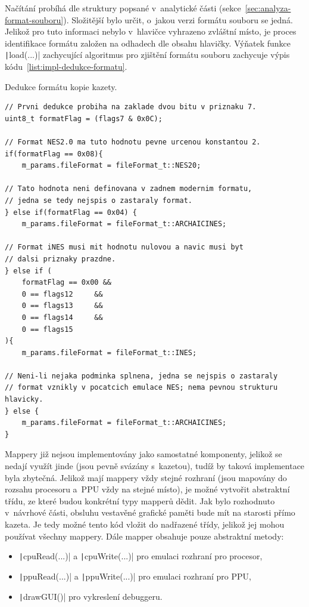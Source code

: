 Načítání probíhá dle struktury popsané v~analytické části (sekce~\ref{sec:analyza-format-souboru}). Složitější bylo určit, o~jakou verzi formátu souboru se jedná. Jelikož pro tuto informaci nebylo v~hlavičce vyhrazeno zvláštní místo, je proces identifikace formátu založen na odhadech dle obsahu hlavičky. Výňatek funkce \texttt|load(...)| zachycující algoritmus pro zjištění formátu souboru zachycuje výpis kódu~\ref{list:impl-dedukce-formatu}.

\begin{listing}
	\caption{Dedukce formátu kopie kazety.}
	\label{list:impl-dedukce-formatu}
	\begin{verbatim}
// Prvni dedukce probiha na zaklade dvou bitu v priznaku 7.
uint8_t formatFlag = (flags7 & 0x0C);

// Format NES2.0 ma tuto hodnotu pevne urcenou konstantou 2.
if(formatFlag == 0x08){
	m_params.fileFormat = fileFormat_t::NES20;
	
// Tato hodnota neni definovana v zadnem modernim formatu,
// jedna se tedy nejspis o zastaraly format.
} else if(formatFlag == 0x04) {
	m_params.fileFormat = fileFormat_t::ARCHAICINES;
	
// Format iNES musi mit hodnotu nulovou a navic musi byt
// dalsi priznaky prazdne.
} else if (
	formatFlag == 0x00 &&
	0 == flags12     &&
	0 == flags13     &&
	0 == flags14     &&
	0 == flags15
){
	m_params.fileFormat = fileFormat_t::INES;
	
// Neni-li nejaka podminka splnena, jedna se nejspis o zastaraly
// format vznikly v pocatcich emulace NES; nema pevnou strukturu hlavicky.
} else {
	m_params.fileFormat = fileFormat_t::ARCHAICINES;
}	
	\end{verbatim}
\end{listing}

Mappery již nejsou implementovány jako samostatné komponenty, jelikož se nedají využít jinde (jsou pevně svázány s~kazetou), tudíž by taková implementace byla zbytečná. Jelikož mají mappery vždy stejné rozhraní (jsou mapovány do rozsahu procesoru a~PPU vždy na stejné místo), je možné vytvořit abstraktní třídu, ze které budou konkrétní typy mapperů dědit. Jak bylo rozhodnuto v~návrhové části, obsluhu vestavěné grafické paměti bude mít na starosti přímo kazeta. Je tedy možné tento kód vložit do nadřazené třídy, jelikož jej mohou používat všechny mappery. Dále mapper obsahuje pouze abstraktní metody:
\begin{itemize}
	\item \texttt|cpuRead(...)| a \texttt|cpuWrite(...)| pro emulaci rozhraní pro procesor,
	\item \texttt|ppuRead(...)| a \texttt|ppuWrite(...)| pro emulaci rozhraní pro PPU,
	\item \texttt|drawGUI()| pro vykreslení debuggeru.
\end{itemize}

